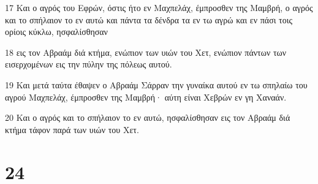 \par 17 Και ο αγρός του Εφρών, όστις ήτο εν Μαχπελάχ, έμπροσθεν της Μαμβρή, ο αγρός και το σπήλαιον το εν αυτώ και πάντα τα δένδρα τα εν τω αγρώ και εν πάσι τοις ορίοις κύκλω, ησφαλίσθησαν
\par 18 εις τον Αβραάμ διά κτήμα, ενώπιον των υιών του Χετ, ενώπιον πάντων των εισερχομένων εις την πύλην της πόλεως αυτού.
\par 19 Και μετά ταύτα έθαψεν ο Αβραάμ Σάρραν την γυναίκα αυτού εν τω σπηλαίω του αγρού Μαχπελάχ, έμπροσθεν της Μαμβρή· αύτη είναι Χεβρών εν γη Χαναάν.
\par 20 Και ο αγρός και το σπήλαιον το εν αυτώ, ησφαλίσθησαν εις τον Αβραάμ διά κτήμα τάφον παρά των υιών του Χετ.

\chapter{24}

